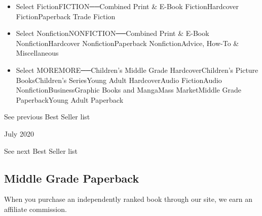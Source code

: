 \begin{itemize}
\tightlist
\item
  Select FictionFICTION──Combined Print \& E-Book FictionHardcover
  FictionPaperback Trade Fiction
\item
  Select NonfictionNONFICTION──Combined Print \& E-Book
  NonfictionHardcover NonfictionPaperback NonfictionAdvice, How-To \&
  Miscellaneous
\item
  Select MOREMORE──Children's Middle Grade HardcoverChildren's Picture
  BooksChildren's SeriesYoung Adult HardcoverAudio FictionAudio
  NonfictionBusinessGraphic Books and MangaMass MarketMiddle Grade
  PaperbackYoung Adult Paperback
\end{itemize}

\href{/books/best-sellers/2020/06/01/middle-grade-paperback-monthly/}{}

See previous Best Seller list

July 2020

See next Best Seller list

\hypertarget{middle-grade-paperback}{%
\subsection{Middle Grade Paperback}\label{middle-grade-paperback}}

When you purchase an independently ranked book through our site, we earn
an affiliate commission.


